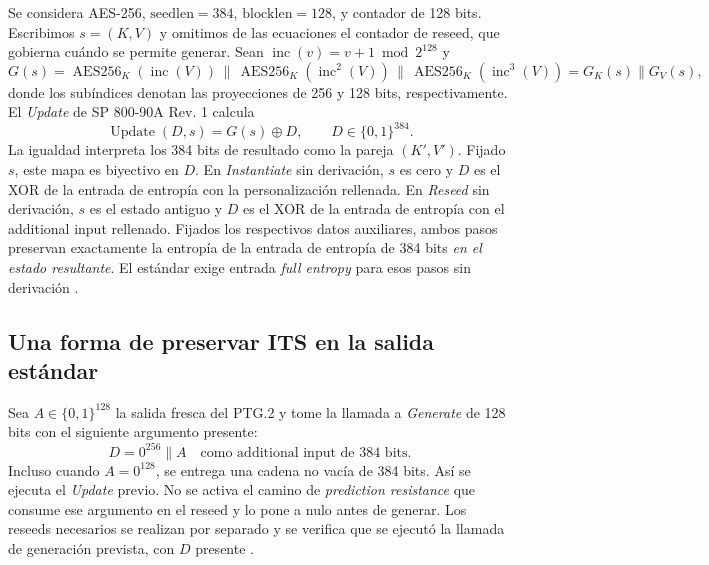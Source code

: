 \documentclass[11pt,a4paper]{article}
\newcommand{\bits}{\{0,1\}}
\newcommand{\AES}{\operatorname{AES256}}
\newcommand{\inc}{\operatorname{inc}}
\begin{document}
Se considera AES-256, $\mathrm{seedlen}=384$, $\mathrm{blocklen}=128$,
y contador de 128 bits. Escribimos $s=(K,V)$ y omitimos de las ecuaciones
el contador de reseed, que gobierna cuándo se permite generar.
Sean $\inc(v)=v+1\bmod 2^{128}$ y
\[
G(s)=
 \AES_K(\inc(V))\,\|\,\AES_K(\inc^2(V))\,\|\,\AES_K(\inc^3(V))
 =G_K(s)\|G_V(s),
\]
donde los subíndices denotan las proyecciones de 256 y 128 bits,
respectivamente. El \emph{Update} de SP 800-90A Rev. 1 calcula
\[
\operatorname{Update}(D,s)=G(s)\oplus D,\qquad D\in\bits^{384}.
\]
La igualdad interpreta los 384 bits de resultado como la pareja
$(K',V')$. Fijado $s$, este mapa es biyectivo en $D$.
En \emph{Instantiate} sin derivación, $s$ es cero y $D$ es el
XOR de la entrada de entropía con la personalización rellenada.
En \emph{Reseed} sin derivación, $s$ es el estado antiguo y $D$
es el XOR de la entrada de entropía con el additional input
rellenado. Fijados los respectivos datos auxiliares, ambos pasos
preservan exactamente la entropía de la entrada de entropía
de 384 bits \emph{en el estado resultante}.
El estándar exige entrada \emph{full entropy} para esos
pasos sin derivación \cite[§10.2.1, tabla 3 y §§10.2.1.2--10.2.1.4]{nist}.

\subsection{Una forma de preservar ITS en la salida estándar}

Sea $A\in\bits^{128}$ la salida fresca del PTG.2 y tome la llamada
a \emph{Generate} de 128 bits con el siguiente argumento presente:
\[
 \boxed{D=0^{256}\|A\quad\text{como additional input de 384 bits.}}
\]
Incluso cuando $A=0^{128}$, se entrega una cadena no vacía
de 384 bits. Así se ejecuta el \emph{Update} previo.
No se activa el camino de \emph{prediction resistance} que
consume ese argumento en el reseed y lo pone a nulo antes de generar.
Los reseeds necesarios se realizan por separado y se verifica que
se ejecutó la llamada de generación prevista, con $D$ presente
\cite[§9.3.3 y §10.2.1.5.1]{nist}.
\end{document}
